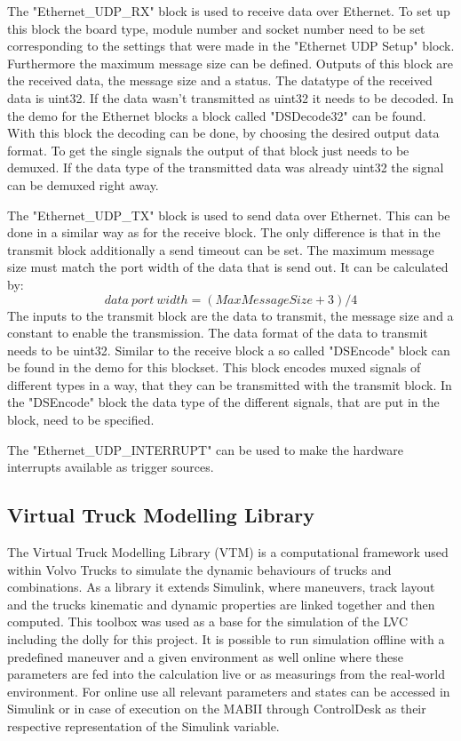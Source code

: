 \documentclass[ExampleMasters.tex]{subfiles}
\begin{document}
The "Ethernet\_UDP\_RX" block is used to receive data over Ethernet. To set up this block the board type, module number and socket number need to be set corresponding to the settings that were made in the "Ethernet UDP Setup" block. Furthermore the maximum message size can be defined. Outputs of this block are the received data, the message size and a status. The datatype of the received data is uint32. If the data wasn't transmitted as uint32 it needs to be decoded. In the demo for the Ethernet blocks a block called "DSDecode32" can be found. With this block the decoding can be done, by choosing the desired output data format. To get the single signals the output of that block just needs to be demuxed. If the data type of the transmitted data was already uint32 the signal can be demuxed right away.

The "Ethernet\_UDP\_TX" block is used to send data over Ethernet. This can be done in a similar way as for the receive block. The only difference is that in the transmit block additionally a send timeout can be set. The maximum message size must match the port width of the data that is send out. It can be calculated by:
\begin{equation}
data\ port\ width=(MaxMessageSize + 3) / 4
\end{equation}
The inputs to the transmit block are the data to transmit, the message size and a constant to enable the transmission. The data format of the data to transmit needs to be uint32. Similar to the receive block a so called "DSEncode" block can be found in the demo for this blockset. This block encodes muxed signals of different types in a way, that they can be transmitted with the transmit block. In the "DSEncode" block the data type of the different signals, that are put in the block, need to be specified.

The "Ethernet\_UDP\_INTERRUPT" can be used to make the hardware interrupts available as trigger sources.
\subsection{Virtual Truck Modelling Library}
\label{sec:VTM}
The Virtual Truck Modelling Library (VTM) is a computational framework used within Volvo Trucks to simulate the dynamic behaviours of trucks and combinations. As a library it extends Simulink, where maneuvers, track layout and the trucks kinematic and dynamic properties are linked together and then computed. This toolbox was used as a base for the simulation of the LVC including the dolly for this project. It is possible to run simulation offline with a predefined maneuver and a given environment as well online where these parameters are fed into the calculation live or as measurings from the real-world environment. For online use all relevant parameters and states can be accessed in Simulink or in case of execution on the MABII through ControlDesk as their respective representation of the Simulink variable. 
\end{document}
